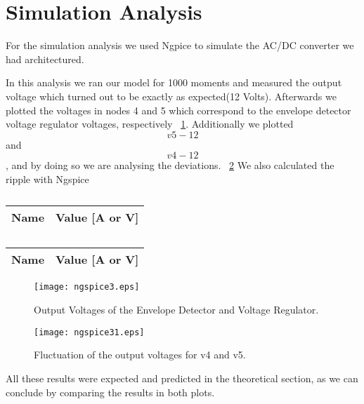 \section{Simulation Analysis}
\label{sec:simulation}


For the simulation analysis we used Ngpice to simulate the AC/DC converter we had architectured. 


In this analysis we ran our model for 1000 moments and measured the output voltage which turned out to be exactly as expected(12 Volts). Afterwards we plotted the voltages in nodes 4 and 5 which correspond to the envelope detector voltage regulator voltages, respectively ~\ref{fig:ngspice3}. Additionally we plotted $$v5 - 12$$ and $$v4 - 12$$, and by doing so we are analysing the deviations. ~\ref{fig:ngspice31} We also calculated the ripple with Ngspice

\begin{table}[h]
  \centering
  \begin{tabular}{|l|r|}
    \hline    
    {\bf Name} & {\bf Value [A or V]} \\ \hline
    
  \end{tabular}
  \caption{}
  \label{tab:tabela1}
\end{table}

\begin{table}[h]
  \centering
  \begin{tabular}{|l|r|}
    \hline    
    {\bf Name} & {\bf Value [A or V]} \\ \hline
    
  \end{tabular}
  \caption{}
  \label{tab:tabela2}
\end{table}

\begin{figure}[h] \centering
\texttt{[image: ngspice3.eps]}
\caption{Output Voltages of the Envelope Detector and Voltage Regulator.}
\label{fig:ngspice3}
\end{figure}

\begin{figure}[h] \centering
\texttt{[image: ngspice31.eps]}
\caption{Fluctuation of the output voltages for v4 and v5.}
\label{fig:ngspice31}
\end{figure}


All these results were expected and predicted in the theoretical section, as we can conclude by comparing the results in both plots.
